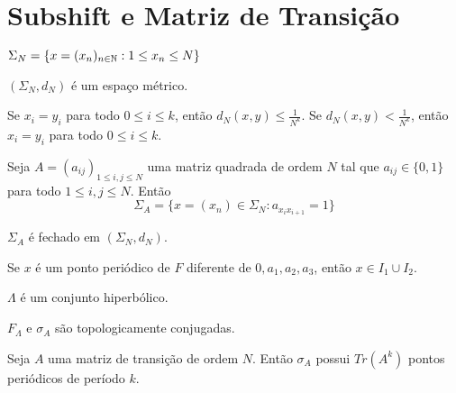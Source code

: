 \section{Subshift e Matriz de Transição}

\begin{definition}
$\Sigma_N = \{ x = (x_n)_{n \in \mathbb{N}}: 1 \leq x_n \leq N \}$
\end{definition}

\begin{proposition}
$(\Sigma_N, d_N)$ é um espaço métrico.
\end{proposition}

\begin{proposition}
Se $x_i = y_i$ para todo $0 \leq i \leq k$, então $d_N(x, y) \leq \frac{1}{N^k}$. Se $d_N(x, y) < \frac{1}{N^k}$, então $x_i = y_i$ para todo $0 \leq i \leq k$.
\end{proposition}

\begin{definition}
Seja $A = (a_{ij})_{1 \leq i,j \leq N}$ uma matriz quadrada de ordem $N$ tal que $a_{ij} \in \{ 0, 1 \}$ para todo $1 \leq i,j \leq N$. Então
$$\Sigma_A = \{ x = (x_n) \in \Sigma_N : a_{x_i x_{i+1}} = 1\}$$
\end{definition}

\begin{proposition}
$\Sigma_A$ é fechado em $(\Sigma_N, d_N)$.
\end{proposition}

\begin{proposition}
Se $x$ é um ponto periódico de $F$ diferente de $0, a_1, a_2, a_3$, então $x \in I_1 \cup I_2$.
\end{proposition}

\begin{lemma}
$\Lambda$ é um conjunto hiperbólico.
\end{lemma}

\begin{theorem}
$F_\Lambda$ e $\sigma_A$ são topologicamente conjugadas.
\end{theorem}

\begin{proposition}
Seja $A$ uma matriz de transição de ordem $N$. Então $\sigma_A$ possui $Tr(A^k)$ pontos periódicos de período $k$.
\end{proposition}














